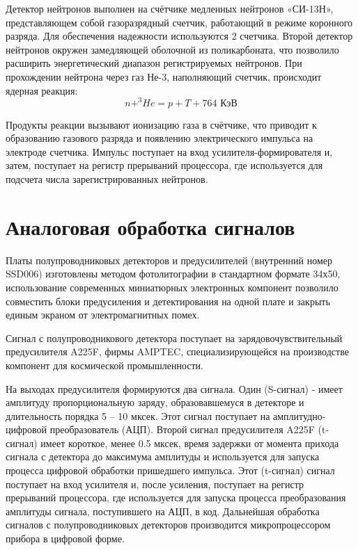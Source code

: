 Детектор нейтронов выполнен на счётчике медленных нейтронов «СИ-13Н», представляющем собой газоразрядный  счетчик, работающий в режиме коронного разряда. Для обеспечения надежности используются 2 счетчика. Второй детектор нейтронов окружен замедляющей оболочной из поликарбоната, что позволило расширить энергетический диапазон регистрируемых нейтронов. При прохождении нейтрона через газ Не-3, наполняющий счетчик, происходит ядерная реакция:
\[ n+^3\!He = p+T+764 \textrm{ КэВ}\]

Продукты реакции вызывают ионизацию газа в счётчике, что приводит к образованию газового разряда и появлению электрического импульса на электроде счетчика. Импульс поступает на вход усилителя-формирователя и, затем, поступает на регистр прерываний процессора, где используется для подсчета числа зарегистрированных нейтронов.

\section{Аналоговая обработка сигналов}

Платы полупроводниковых детекторов и предусилителей (внутренний номер SSD006) изготовлены методом фотолитографии в стандартном формате 34х50, использование современных миниатюрных электронных компонент позволило совместить блоки предусиления и детектирования на одной плате и закрыть единым экраном от электромагнитных помех.

Сигнал с полупроводникового детектора поступает на зарядовочувствительный предусилителя A225F, фирмы AMPTEC, специализирующейся на производстве компонент для космической промышленности. 


На выходах предусилителя формируются два сигнала. Один (S-сигнал) - имеет амплитуду пропорциональную заряду, образовавшемуся в детекторе и длительность порядка 5 -- 10 мксек. Этот сигнал поступает на амплитудно-цифровой преобразователь (АЦП). Второй сигнал предусилителя A225F (t-сигнал) имеет короткое, менее 0.5 мксек, время задержки от момента прихода сигнала с детектора до максимума амплитуды и используется для запуска процесса цифровой обработки пришедшего импульса. Этот (t-сигнал) сигнал поступает на вход усилителя и, после усиления, поступает на регистр прерываний процессора, где используется для запуска процесса преобразования амплитуды сигнала, поступившего на АЦП, в код. Дальнейшая обработка сигналов с полупроводниковых детекторов производится микропроцессором прибора в цифровой форме.

